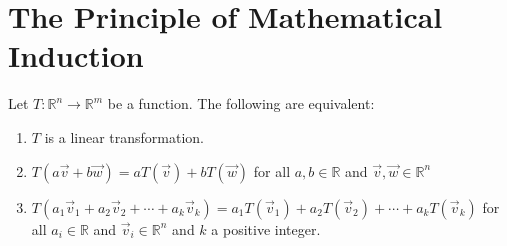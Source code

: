 \section{The Principle of Mathematical Induction}

\begin{theorem*}
Let $T:\mathbb{R}^n\to\mathbb{R}^m$ be a function. The following are equivalent:
\begin{enumerate}
\item $T$ is a linear transformation.
\item $T(a\vec{v}+b\vec{w})=aT(\vec{v})+bT(\vec{w})$ for all $a,b \in \mathbb{R}$
and $\vec{v},\vec{w} \in \mathbb{R}^n$
\item $T(a_1\vec{v}_1+a_2\vec{v}_2+\cdots+a_k\vec{v}_k)=                                                                                                                
a_1T(\vec{v}_1)+a_2T(\vec{v}_2)+\cdots+a_kT(\vec{v}_k)$
for all $a_i \in \mathbb{R}$ and $\vec{v}_i \in \mathbb{R}^n$ and $k$ a positive integer.
\end{enumerate}
\end{theorem*}


